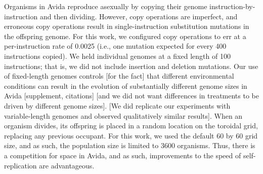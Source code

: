 Organisms in Avida reproduce asexually by copying their genome instruction-by-instruction and then dividing. 
However, copy operations are imperfect, and erroneous copy operations result in single-instruction substitution mutations in the offspring genome. 
For this work, we configured copy operations to err at a per-instruction rate of 0.0025 (i.e., one mutation expected for every 400 instructions copied).
We held individual genomes at a fixed length of 100 instructions; that is, we did not include insertion and deletion mutations. 
Our use of fixed-length genomes controls [for the fact] that different environmental conditions can result in the evolution of substantially different genome sizes in Avida [supplement, citations] [and we did not want differences in treatments to be driven by different genome sizes].
[We did replicate our experiments with variable-length genomes and observed qualitatively similar results].
When an organism divides, its offspring is placed in a random location on the toroidal grid, replacing any previous occupant.
For this work, we used the default 60 by 60 grid size, and as such, the population size is limited to 3600 organisms.
Thus, there is a competition for space in Avida, and as such, improvements to the speed of self-replication are advantageous.



